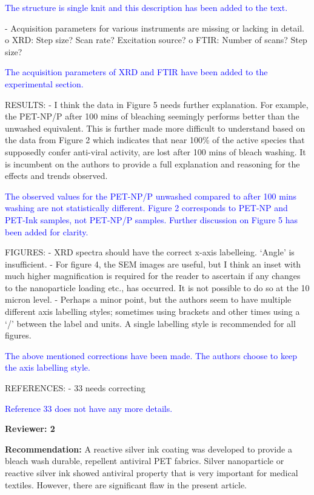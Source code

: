 \documentclass[12pt]{letter}
\newcommand{\blue}[1]{\textcolor{blue}{#1}} %
\begin{document}
\blue{The structure is single knit and this description has been added to the text.}

- Acquisition parameters for various instruments are missing or lacking in detail.
o XRD: Step size? Scan rate? Excitation source?
o FTIR: Number of scans? Step size?

\blue{The acquisition parameters of XRD and FTIR have been added to the experimental section.}

RESULTS:
- I think the data in Figure 5 needs further explanation. For example, the PET-NP/P after 100 mins of bleaching seemingly performs better than the unwashed equivalent. This is further made more difficult to understand based on the data from Figure 2 which indicates that near 100\% of the active species that supposedly confer anti-viral activity, are lost after 100 mins of bleach washing. It is incumbent on the authors to provide a full explanation and reasoning for the effects and trends observed.

\blue{ The observed values for the PET-NP/P unwashed compared to after 100 mins washing are not statistically different. Figure 2 corresponds to PET-NP and PET-Ink samples, not PET-NP/P samples. Further discussion on Figure 5 has been added for clarity.}

FIGURES:
- XRD spectra should have the correct x-axis labelleing. ‘Angle’ is insufficient.
- For figure 4, the SEM images are useful, but I think an inset with much higher magnification is required for the reader to ascertain if any changes to the nanoparticle loading etc., has occurred. It is not possible to do so at the 10 micron level.
- Perhaps a minor point, but the authors seem to have multiple different axis labelling styles; sometimes using brackets and other times using a ‘/’ between the label and units. A single labelling style is recommended for all figures.

\blue{The above mentioned corrections have been made. The authors choose to keep the axis labelling style. }


REFERENCES:
- 33 needs correcting

\blue{Reference 33 does not have any more details. }

\newpage
\textbf{Reviewer: 2}

\textbf{Recommendation:} A reactive silver ink coating was developed to provide a bleach wash durable, repellent antiviral PET fabrics. Silver nanoparticle or reactive silver ink showed antiviral property that is very important for medical textiles. However, there are significant flaw in the present article.
\end{document}
